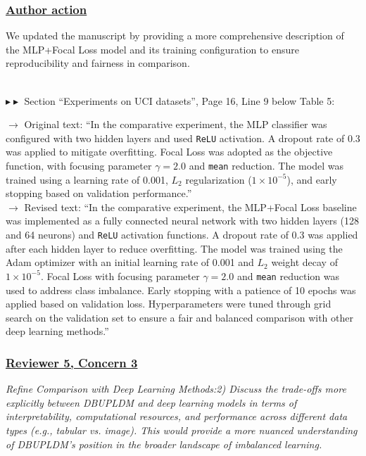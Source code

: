 \documentclass[journal,12pn, onecolumn]{IEEEtran}
\begin{document}
{{{{{{{\color{black}
\subsubsection*{\textbf{\underline{Author action}}}
We updated the manuscript by providing a more comprehensive description of the MLP+Focal Loss model and its training configuration to ensure reproducibility and fairness in comparison.
}\\

$\blacktriangleright\blacktriangleright$ Section ``Experiments on UCI datasets'', Page 16,  Line 9 below Table 5:\\
\par
{\color{black}$\longrightarrow$ Original text: ``In the comparative experiment, the MLP classifier was configured with two hidden layers and used \texttt{ReLU} activation. A dropout rate of 0.3 was applied to mitigate overfitting. Focal Loss was adopted as the objective function, with focusing parameter $\gamma = 2.0$ and \texttt{mean} reduction. The model was trained using a learning rate of 0.001, $L_2$ regularization ($1 \times 10^{-5}$), and early stopping based on validation performance.''}\\

{\color{orange}$\longrightarrow$ Revised text: ``In the comparative experiment, the MLP+Focal Loss baseline was implemented as a fully connected neural network with two hidden layers (128 and 64 neurons) and \texttt{ReLU} activation functions. A dropout rate of 0.3 was applied after each hidden layer to reduce overfitting. The model was trained using the Adam optimizer with an initial learning rate of 0.001 and $L_2$ weight decay of $1\times10^{-5}$. Focal Loss with focusing parameter $\gamma = 2.0$ and \texttt{mean} reduction was used to address class imbalance. Early stopping with a patience of 10 epochs was applied based on validation loss. Hyperparameters were tuned through grid search on the validation set to ensure a fair and balanced comparison with other deep learning methods.''}\\


\textcolor{customgreen}{
\subsubsection*{\underline{\textbf{Reviewer 5, Concern 3}}}
\emph{Refine Comparison with Deep Learning Methods:2) Discuss the trade-offs more explicitly between DBUPLDM and deep learning models in terms of interpretability, computational resources, and performance across different data types (e.g., tabular vs. image). This would provide a more nuanced understanding of DBUPLDM's position in the broader landscape of imbalanced learning.
}}\\
{\color{black}
}}}}}}}
\end{document}
